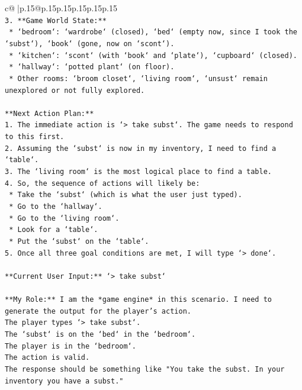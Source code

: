 \documentclass{article}
\begin{document}
{\begin{supertabular}{c@{$\;$}|p{.15\linewidth}@{}p{.15\linewidth}p{.15\linewidth}p{.15\linewidth}p{.15\linewidth}p{.15\linewidth}}
{{{\\ 
\texttt{3.  **Game World State:**} \\
\texttt{    *   `bedroom`: `wardrobe` (closed), `bed` (empty now, since I took the `subst`), `book` (gone, now on `scont`).} \\
\texttt{    *   `kitchen`: `scont` (with `book` and `plate`), `cupboard` (closed).} \\
\texttt{    *   `hallway`: `potted plant` (on floor).} \\
\texttt{    *   Other rooms: `broom closet`, `living room`, `unsust` remain unexplored or not fully explored.} \\
\\ 
\texttt{**Next Action Plan:**} \\
\texttt{1.  The immediate action is `> take subst`. The game needs to respond to this first.} \\
\texttt{2.  Assuming the `subst` is now in my inventory, I need to find a `table`.} \\
\texttt{3.  The `living room` is the most logical place to find a table.} \\
\texttt{4.  So, the sequence of actions will likely be:} \\
\texttt{    *   Take the `subst` (which is what the user just typed).} \\
\texttt{    *   Go to the `hallway`.} \\
\texttt{    *   Go to the `living room`.} \\
\texttt{    *   Look for a `table`.} \\
\texttt{    *   Put the `subst` on the `table`.} \\
\texttt{5.  Once all three goal conditions are met, I will type `> done`.} \\
\\ 
\texttt{**Current User Input:** `> take subst`} \\
\\ 
\texttt{**My Role:** I am the *game engine* in this scenario. I need to generate the output for the player's action.} \\
\texttt{The player types `> take subst`.} \\
\texttt{The `subst` is on the `bed` in the `bedroom`.} \\
\texttt{The player is in the `bedroom`.} \\
\texttt{The action is valid.} \\
\texttt{The response should be something like "You take the subst. In your inventory you have a subst."} \\
}}}
\end{supertabular}}
\end{document}
